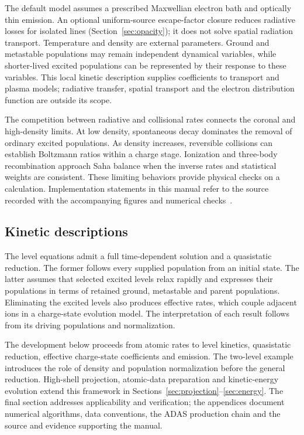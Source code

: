 \documentclass[11pt,a4paper]{article}
\numberwithin{equation}{section}
\begin{document}
The default model assumes a prescribed Maxwellian electron bath and
optically thin emission. An optional uniform-source escape-factor closure
reduces radiative losses for isolated lines (Section~\ref{sec:opacity}); it
does not solve spatial radiation transport. Temperature and density are
external parameters. Ground and
metastable populations may remain independent dynamical variables, while
shorter-lived excited populations can be represented by their response
to these variables. This local kinetic description supplies coefficients
to transport and plasma models; radiative transfer, spatial transport and
the electron distribution function are outside its scope.

The competition between radiative and collisional rates connects the
coronal and high-density limits. At low density, spontaneous decay
dominates the removal of ordinary excited populations. As density
increases, reversible collisions can establish Boltzmann ratios within
a charge stage. Ionization and three-body recombination approach Saha
balance when the inverse rates and statistical weights are consistent.
These limiting behaviors provide physical checks on a calculation.
Implementation statements in this manual refer to the source recorded
with the accompanying figures and numerical checks~\cite{source}.

\subsection{Kinetic descriptions}

The level equations admit a full time-dependent solution and a
quasistatic reduction. The former follows every supplied population from
an initial state. The latter assumes that selected excited levels relax
rapidly and expresses their populations in terms of retained ground,
metastable and parent populations. Eliminating the excited levels also
produces effective rates, which couple adjacent ions in a charge-state
evolution model. The interpretation of each result follows from its
driving populations and normalization.

The development below proceeds from atomic rates to level kinetics,
quasistatic reduction, effective charge-state coefficients and emission.
The two-level example introduces the role of density and population
normalization before the general reduction. High-shell projection,
atomic-data preparation and kinetic-energy evolution extend this
framework in Sections~\ref{sec:projection}--\ref{sec:energy}.
The final section addresses applicability and verification; the
appendices document numerical algorithms, data conventions, the ADAS
production chain and the source and evidence supporting the manual.
\end{document}
